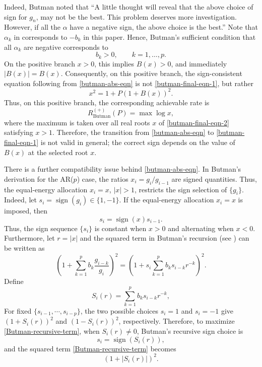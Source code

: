 \documentclass[12pt]{article}
\begin{document}
Indeed, Butman noted that ``A little thought will reveal that the above choice of sign for \(g_n\), may not be the best. This problem deserves more investigation. However, if all the \(\alpha\) have a negative sign, the above choice is the best.'' Note that $\alpha_k$ in \cite{butman1976linear} corresponds to $-b_k$ in this paper. Hence, Butman's sufficient condition that all \(\alpha_k\) are negative corresponds to
$$
    b_k>0,\qquad k=1,\ldots,p .
$$
On the positive branch \(x>0\), this implies $B(x)>0$, and immediately $|B(x)|=B(x)$. Consequently, on this positive branch, the sign-consistent equation following from \eqref{butman-abs-eqn} is not \eqref{butman-final-eqn-1}, but rather
\begin{equation}\label{butman-final-eqn-2}
    x^2=1+P\left(1+B(x)\right)^2 .
\end{equation}
Thus, on this positive branch, the corresponding achievable rate is
$$
    R^{(+)}_{\mathrm{Butman}}(P)=\max \log x,
$$
where the maximum is taken over all real roots $x$ of \eqref{butman-final-eqn-2} satisfying $x>1$. Therefore, the transition from \eqref{butman-abs-eqn} to \eqref{butman-final-eqn-1} is not valid in general; the correct sign depends on the value of $B(x)$ at the selected root $x$.


There is a further compatibility issue behind \eqref{butman-abs-eqn}. In Butman's derivation for the AR($p$) case, the ratios $x_i=g_i/g_{i-1}$ are signed quantities. Thus, the equal-energy allocation $x_i=x$, \(|x|>1\), restricts the sign selection of \(\{g_i\}\). Indeed, let $s_i=\operatorname{sign}(g_i) \in \{1,-1\}$. If the equal-energy allocation $x_i=x$ is imposed, then
\begin{equation}\label{Butman-ee-cond}
    s_i=\operatorname{sign}(x)s_{i-1}.
\end{equation}
Thus, the sign sequence $\{s_i\}$ is constant when $x>0$ and alternating when $x<0$. Furthermore, let $r=|x|$ and the squared term in Butman's recursion (see \cite[Equation (39)]{butman1976linear}) can be written as 
\begin{equation}\label{Butman-recursive-term}
    \left(1+\sum_{k=1}^{p}b_k\frac{g_{i-k}}{g_i}\right)^2 = \left(1+s_i\sum_{k=1}^{p}b_k s_{i-k}r^{-k}\right)^2.
\end{equation}
Define
\[
    S_i(r)=\sum_{k=1}^{p} b_k s_{i-k} r^{-k}, 
\]
For fixed $\{s_{i-1},\cdots,s_{i-p}\}$, the two possible choices $s_i=1$ and $s_i=-1$ give $(1+S_i(r))^2$ and $(1-S_i(r))^2$, respectively. Therefore, to maximize \eqref{Butman-recursive-term}, when \(S_i(r)\neq0\), Butman's recursive sign choice is
\begin{equation}\label{Butman-sign-cond}
    s_i=\operatorname{sign}(S_i(r)),
\end{equation}
and the squared term \eqref{Butman-recursive-term} becomes
\begin{equation}\label{Butman-one-step-factor}
    \left(1+|S_i(r)|\right)^2.
\end{equation}
\end{document}
